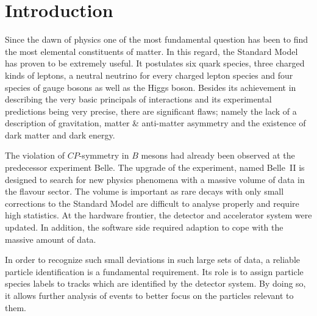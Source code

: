\chapter{Introduction}
\label{chap:introduction}

Since the dawn of physics one of the most fundamental question has been to find the most elemental constituents of matter. In this regard, the Standard Model has proven to be extremely useful. It postulates six quark species, three charged kinds of leptons, a neutral neutrino for every charged lepton species and four species of gauge bosons as well as the Higgs boson. Besides its achievement in describing the very basic principals of interactions and its experimental predictions being very precise, there are significant flaws; namely the lack of a description of gravitation, matter \& anti-matter asymmetry and the existence of dark matter and dark energy.

The violation of $CP$-symmetry in $B$ mesons had already been observed at the predecessor experiment Belle. The upgrade of the experiment, named Belle~\RN{2} is designed to search for new physics phenomena with a massive volume of data in the flavour sector. The volume is important as rare decays with only small corrections to the Standard Model are difficult to analyse properly and require high statistics. At the hardware frontier, the detector and accelerator system were updated. In addition, the software side required adaption to cope with the massive amount of data.

In order to recognize such small deviations in such large sets of data, a reliable particle identification is a fundamental requirement. Its role is to assign particle species labels to tracks which are identified by the detector system. By doing so, it allows further analysis of events to better focus on the particles relevant to them.
